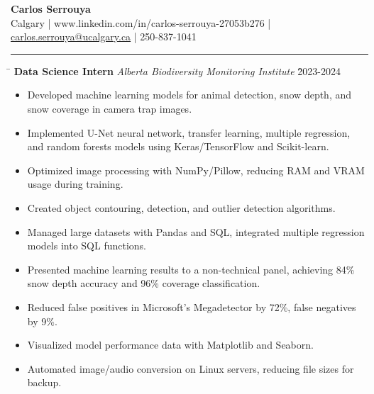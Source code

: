 \documentclass[a4paper,11pt]{article}
\def\locationh{\hspace{7cm}}
\def\titlev{\vspace{.5cm}}
\def\sectionv{\vspace{.2cm}}
\def\subsectionv{\vspace{-5.3ex}}
\def\postpointsv{\vspace{0cm}}
\begin{document}
\begin{center}
    {\LARGE \textbf{Carlos Serrouya}} \\
    Calgary | www.linkedin.com/in/carlos-serrouya-27053b276 | \href{mailto:carlos.serrouya@ucalgary.ca}{carlos.serrouya@ucalgary.ca} | 250-837-1041 \\
\end{center}

\titlev

\noindent {}
\vspace{-2.35em} %
\par\noindent
\rule{\textwidth}{0.4pt}

\sectionv

\noindent \begin{tabbing}
    \locationh \= \kill
    \textbf{Data Science Intern} \> \textit{Alberta Biodiversity Monitoring Institute} \` 2023-2024 \\
\end{tabbing}


\begin{itemize}[leftmargin=.5cm, itemsep=.1cm, before=\subsectionv, after=\postpointsv]
    \item Developed machine learning models for animal detection, snow depth, and snow coverage in camera trap images.
    \item Implemented U-Net neural network, transfer learning, multiple regression, and random forests models using Keras/TensorFlow and Scikit-learn.
    \item Optimized image processing with NumPy/Pillow, reducing RAM and VRAM usage during training.
    \item Created object contouring, detection, and outlier detection algorithms.
    \item Managed large datasets with Pandas and SQL, integrated multiple regression models into SQL functions.
    \item Presented machine learning results to a non-technical panel, achieving 84\% snow depth accuracy and 96\% coverage classification.
    \item Reduced false positives in Microsoft's Megadetector by 72\%, false negatives by 9\%.
    \item Visualized model performance data with Matplotlib and Seaborn.
    \item Automated image/audio conversion on Linux servers, reducing file sizes for backup.
\end{itemize}
\end{document}
